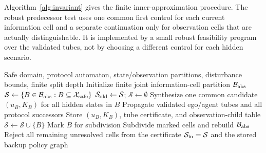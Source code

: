 \documentclass[letterpaper]{article} %
\begin{document}
Algorithm~\ref{alg:invariant} gives the finite inner-approximation procedure.
The robust predecessor test uses one common first control for each current
information cell and a separate continuation only for observation cells that
are actually distinguishable. It is implemented by a small robust feasibility
program over the validated tubes, not by choosing a different control for
each hidden scenario.
\begin{algorithm}[t]
\footnotesize
\caption{Offline information-state invariant and backup synthesis}
\label{alg:invariant}
\begin{algorithmic}[1]
\Require Safe domain, protocol automaton, state/observation partitions, disturbance bounds, finite split depth
\State Initialize finite joint information-cell partition $\mathcal B_{\rm abs}$
\Repeat
  \State $\mathcal S\gets\{B\in\mathcal B_{\rm abs}:B\subseteq\mathcal X_{\rm safe}\}$
  \Repeat
    \State $\mathcal S_{\rm old}\gets\mathcal S$; $\mathcal S\gets\emptyset$
      \State Synthesize one common candidate $(u_B,K_B)$ for all hidden states in $B$
      \State Propagate validated ego/agent tubes and all protocol successors
        \State Store $(u_B,K_B)$, tube certificate, and observation-child table
        \State $\mathcal S\gets\mathcal S\cup\{B\}$
        \State Mark $B$ for subdivision
      \EndIf
    \EndFor
    \State Subdivide marked cells and rebuild $\mathcal B_{\rm abs}$
  \Else
    \State Reject all remaining unresolved cells from the certificate
  \EndIf
{}
\State \Return $\mathcal S_{\rm in}=\mathcal S$ and the stored backup policy graph
\end{algorithmic}
\end{algorithm}
\end{document}
